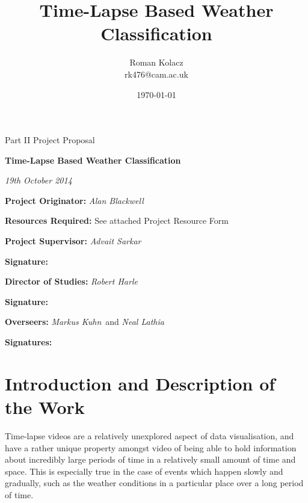 \documentclass[12pt]{article}
\begin{document}
\title{Time-Lapse Based Weather Classification}
\author{Roman Kolacz\\
rk476@cam.ac.uk}
\date{\today}

\thispagestyle{empty}

\medskip
{}
\medskip
{}

\vfil

\centerline{\large Part II Project Proposal}
\vspace{0.4in}
\centerline{\Large\bf Time-Lapse Based Weather Classification}
\vspace{0.3in}
\centerline{\large \emph{19th October 2014}}

\vfil

{\bf Project Originator:} \emph{Alan Blackwell}

\vspace{0.1in}

{\bf Resources Required:} See attached Project Resource Form

\vspace{0.5in}

{\bf Project Supervisor:} \emph{Advait Sarkar}

\vspace{0.2in}

{\bf Signature:}

\vspace{0.5in}

{\bf Director of Studies:}  \emph{Robert Harle}

\vspace{0.2in}

{\bf Signature:}

\vspace{0.5in}

{\bf Overseers:} \emph{Markus Kuhn}\ and \emph{Neal Lathia}

\vspace{0.2in}

{\bf Signatures:} 

\vfil
\eject

\section*{Introduction and Description of the Work}
Time-lapse videos are a relatively unexplored aspect of data visualisation, and have a rather unique property amongst video of being able to hold information about incredibly large periods of time in a relatively small amount of time and space. This is especially true in the case of events which happen slowly and gradually, such as the weather conditions in a particular place over a long period of time.
\end{document}
